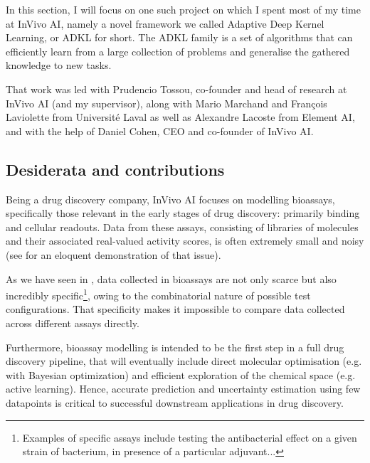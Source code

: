 \documentclass[11pt]{article}
\numberwithin{equation}{subsection}
\begin{document}
In this section, I will focus on one such project on which I spent most of my time at InVivo AI, namely a novel framework we called Adaptive Deep Kernel Learning, or ADKL for short.
The ADKL family is a set of algorithms that can efficiently learn from a large collection of problems and generalise the gathered knowledge to new tasks.

That work was led with Prudencio Tossou, co-founder and head of research at InVivo AI (and my supervisor), along with Mario Marchand and François Laviolette from Université Laval as well as Alexandre Lacoste from Element AI, and with the help of Daniel Cohen, CEO and co-founder of InVivo AI.


\subsection{Desiderata and contributions}

Being a drug discovery company, InVivo AI focuses on modelling bioassays, specifically those relevant in the early stages of drug discovery: primarily binding and cellular readouts. Data from these assays, consisting of libraries of molecules and their associated real-valued activity scores, is often extremely small and noisy (see  for an eloquent demonstration of that issue).

As we have seen in , data collected in bioassays are not only scarce but also incredibly specific\footnote{Examples of specific assays include testing the antibacterial effect on a given strain of bacterium, in presence of a particular adjuvant...}, owing to the combinatorial nature of possible test configurations. That specificity makes it impossible to compare data collected across different assays directly.


Furthermore, bioassay modelling is intended to be the first step in a full drug discovery pipeline, that will eventually include direct molecular optimisation (e.g. with Bayesian optimization) and efficient exploration of the chemical space (e.g. active learning). Hence, accurate prediction and uncertainty estimation using few datapoints is critical to successful downstream applications in drug discovery.

\end{document}
